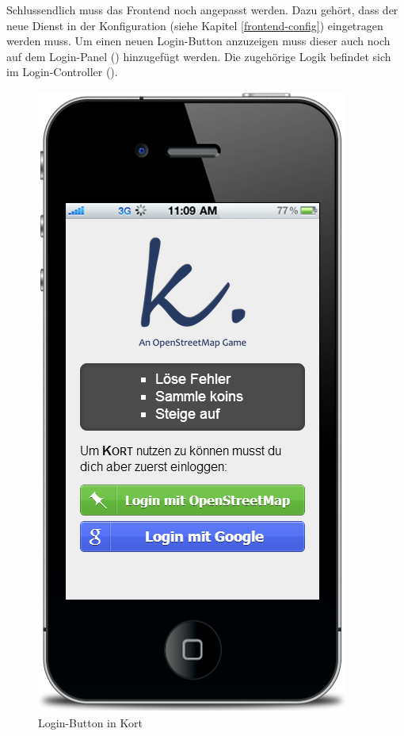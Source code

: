 Schlussendlich muss das Frontend noch angepasst werden.
Dazu gehört, dass der neue Dienst in der Konfiguration (siehe Kapitel \ref{frontend-config}) eingetragen werden muss.
Um einen neuen Login-Button anzuzeigen muss dieser auch noch auf dem Login-Panel () hinzugefügt werden.
Die zugehörige Logik befindet sich im Login-Controller ().
\begin{figure}[H]
	\centering
	\includegraphics[scale=0.5]{images/screenshots/kort-screenshot-login}
	\caption{Login-Button in Kort}
\end{figure}



